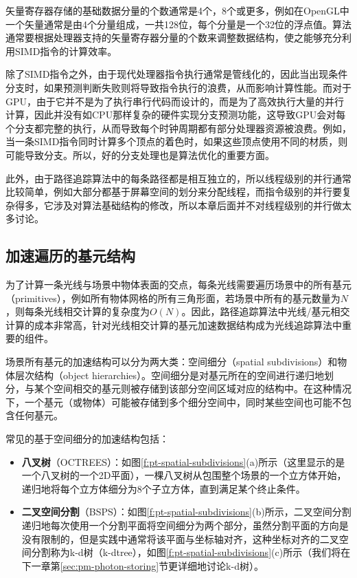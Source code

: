 矢量寄存器存储的基础数据分量的个数通常是4个，8个或更多，例如在OpenGL中一个矢量通常是由4个分量组成，一共128位，每个分量是一个32位的浮点值。算法通常要根据处理器支持的矢量寄存器分量的个数来调整数据结构，使之能够充分利用SIMD指令的计算效率。
 
除了SIMD指令之外，由于现代处理器指令执行通常是管线化的，因此当出现条件分支时，如果预测判断失败则将导致指令执行的浪费，从而影响计算性能。而对于GPU，由于它并不是为了执行串行代码而设计的，而是为了高效执行大量的并行计算，因此并没有如CPU那样复杂的硬件实现分支预测功能，这导致GPU会对每个分支都完整的执行，从而导致每个时钟周期都有部分处理器资源被浪费。例如，当一条SIMD指令同时计算多个顶点的着色时，如果这些顶点使用不同的材质，则可能导致分支。所以，好的分支处理也是算法优化的重要方面。

此外，由于路径追踪算法中的每条路径都是相互独立的，所以线程级别的并行通常比较简单，例如大部分都基于屏幕空间的划分来分配线程，而指令级别的并行要复杂得多，它涉及对算法基础结构的修改，所以本章后面并不对线程级别的并行做太多讨论。






\subsection{加速遍历的基元结构}
 为了计算一条光线与场景中物体表面的交点，每条光线需要遍历场景中的所有基元（primitives），例如所有物体网格的所有三角形面，若场景中所有的基元数量为$N$，则每条光线相交计算的复杂度为$O(N)$。因此，路径追踪算法中光线/基元相交计算的成本非常高，针对光线相交计算的基元加速数据结构成为光线追踪算法中重要的组件。

场景所有基元的加速结构可以分为两大类：空间细分（spatial subdivisions）和物体层次结构（object hierarchies）。空间细分是对基元所在的空间进行递归地划分，与某个空间相交的基元则被存储到该部分空间区域对应的结构中。在这种情况下，一个基元（或物体）可能被存储到多个细分空间中，同时某些空间也可能不包含任何基元。

常见的基于空间细分的加速结构包括：

\begin{itemize}
  \item \textbf{八叉树}（OCTREES）：如图\ref{f:pt-spatial-subdivisions}(a)所示（这里显示的是一个八叉树的一个2D平面），一棵八叉树从包围整个场景的一个立方体开始，递归地将每个立方体细分为8个子立方体，直到满足某个终止条件。
  \item \textbf{二叉空间分割}（BSPS）：如图\ref{f:pt-spatial-subdivisions}(b)所示，二叉空间分割递归地每次使用一个分割平面将空间细分为两个部分，虽然分割平面的方向是没有限制的，但是实践中通常将该平面与坐标轴对齐，这种坐标对齐的二叉空间分割称为k-d树（k-dtree），如图\ref{f:pt-spatial-subdivisions}(c)所示（我们将在下一章第\ref{sec:pm-photon-storing}节更详细地讨论k-d树）。
\end{itemize}

